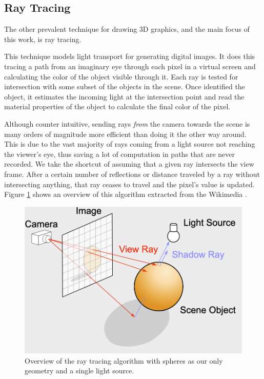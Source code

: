 \subsection{Ray Tracing}
The other prevalent technique for drawing 3D graphics, and the main focus of this work, is ray tracing.

This technique models light transport for generating digital images. It does this tracing a path from an imaginary eye through each pixel in a virtual screen and calculating the color of the object visible through it. Each ray is tested for intersection with some subset of the objects in the scene. Once identified the object, it estimates the incoming light at the intersection point and read the material properties of the object to calculate the final color of the pixel.

Although counter intuitive, sending rays \textit{from} the camera towards the scene is many orders of magnitude more efficient than doing it the other way around. This is due to the vast majority of rays coming from a light source not reaching the viewer's eye, thus saving a lot of computation in paths that are never recorded. We take the shortcut of assuming that a given ray intersects the view frame. After a certain number of reflections or distance traveled by a ray without intersecting anything, that ray ceases to travel and the pixel's value is updated. Figure \ref{rt-overview-image} shows an overview of this algorithm extracted from the Wikimedia \cite{WikimediaRT}.


\begin{figure}[hbt!]
    \centering
    \includegraphics[width=1.0\textwidth]{figuras/RT-Diagram.png}
    \caption{Overview of the ray tracing algorithm with spheres as our only geometry and a single light source.}
    \label{rt-overview-image}
\end{figure}

